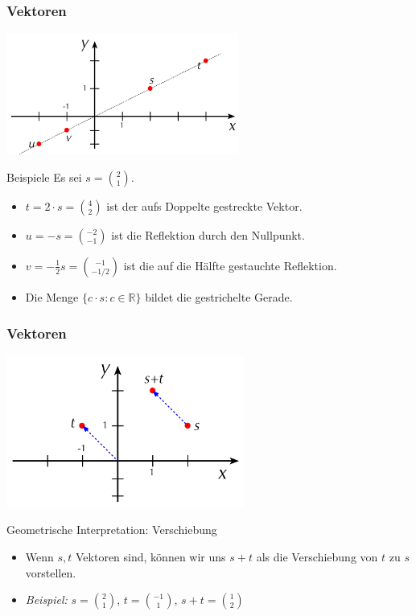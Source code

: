 \documentclass{beamer}
\renewcommand{\emph}[1]{{\textcolor{solarizedRed}{\itshape #1}}}
\newcommand\RR{\mathbb R}
\renewcommand{\ae}{\"a}
\renewcommand{\oe}{\"o}
\newcommand{\mytitle}{Vektoren}
\begin{document}
\begin{frame}\frametitle{\mytitle}
	\hfill\includegraphics[height=40mm]{pics/vectorscaling.pdf}
	\begin{block}{Beispiele}
		Es sei $s=\binom21$.
		\begin{itemize}
			\item $t=2\cdot s=\binom42$ ist der aufs Doppelte gestreckte Vektor.
			\item $u=-s=\binom{-2}{-1}$ ist die Reflektion durch den Nullpunkt.
			\item $v=-\frac12s=\binom{-1}{-1/2}$ ist die auf die H\ae lfte gestauchte Reflektion. 
			\item Die Menge $\{c\cdot s:c\in\RR\}$ bildet die gestrichelte Gerade.
		\end{itemize}
	\end{block}
\end{frame}

\begin{frame}\frametitle{\mytitle}
	\hfill\includegraphics[height=50mm]{pics/vectoradd.pdf}
	\begin{block}{Geometrische Interpretation: Verschiebung}
	\begin{itemize}
	\item Wenn $s,t$ Vektoren sind, k\oe nnen wir uns $s+t$ als die Verschiebung von $t$ zu $s$ vorstellen.
	\item \emph{Beispiel:} $s=\binom 21$, $t=\binom{-1}1$, $s+t=\binom12$
	\end{itemize}
	\end{block}
\end{frame}
\end{document}
